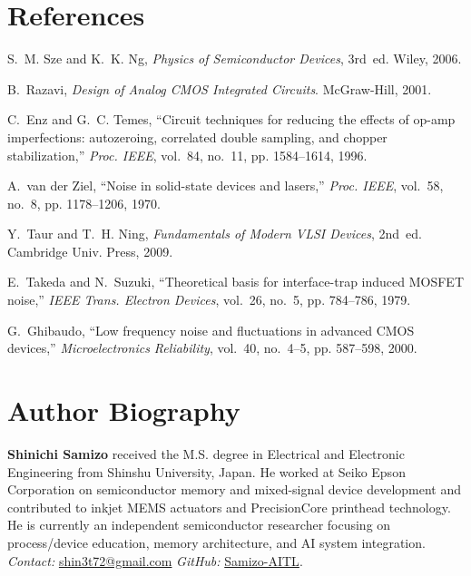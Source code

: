 \documentclass[conference]{IEEEtran}
\begin{document}
\section*{References}
\begin{thebibliography}{10}

S.~M. Sze and K.~K. Ng, \emph{Physics of Semiconductor Devices}, 3rd~ed. Wiley, 2006.

B.~Razavi, \emph{Design of Analog CMOS Integrated Circuits}. McGraw-Hill, 2001.

C.~Enz and G.~C. Temes, ``Circuit techniques for reducing the effects of op-amp imperfections: autozeroing, correlated double sampling, and chopper stabilization,'' \emph{Proc. IEEE}, vol.~84, no.~11, pp. 1584--1614, 1996.

A.~van der Ziel, ``Noise in solid-state devices and lasers,'' \emph{Proc. IEEE}, vol.~58, no.~8, pp. 1178--1206, 1970.

Y.~Taur and T.~H. Ning, \emph{Fundamentals of Modern VLSI Devices}, 2nd~ed. Cambridge Univ. Press, 2009.

E.~Takeda and N.~Suzuki, ``Theoretical basis for interface-trap induced MOSFET noise,'' \emph{IEEE Trans. Electron Devices}, vol.~26, no.~5, pp. 784--786, 1979.

G.~Ghibaudo, ``Low frequency noise and fluctuations in advanced CMOS devices,'' \emph{Microelectronics Reliability}, vol.~40, no.~4--5, pp. 587--598, 2000.

\end{thebibliography}

\section*{Author Biography}
\textbf{Shinichi Samizo} received the M.S. degree in Electrical and Electronic Engineering from Shinshu University, Japan. He worked at Seiko Epson Corporation on semiconductor memory and mixed-signal device development and contributed to inkjet MEMS actuators and PrecisionCore printhead technology. He is currently an independent semiconductor researcher focusing on process/device education, memory architecture, and AI system integration.\\[2pt]
\emph{Contact:} \href{mailto:shin3t72@gmail.com}{shin3t72@gmail.com}\quad
\emph{GitHub:} \href{https://github.com/Samizo-AITL}{Samizo-AITL}.
\end{document}
